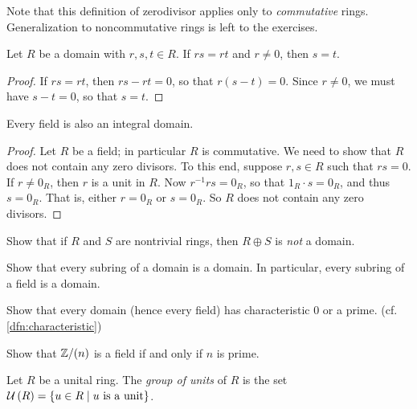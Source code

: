 Note that this definition of zerodivisor applies only to \emph{commutative} rings.
Generalization to noncommutative rings is left to the exercises.

\begin{prop}[Cancellation] \label{prop:cancellation}
Let \(R\) be a domain with \(r,s,t \in R\).
If \(rs = rt\) and \(r \neq 0\), then \(s = t\).
\end{prop}

\begin{proof}
If \(rs = rt\), then \(rs - rt = 0\), so that \(r(s-t) = 0\).
Since \(r \neq 0\), we must have \(s-t = 0\), so that \(s = t\).
\end{proof}


\begin{prop}
Every field is also an integral domain.
\end{prop}

\begin{proof}
Let \(R\) be a field; in particular \(R\) is commutative.
We need to show that \(R\) does not contain any zero divisors.
To this end, suppose \(r,s \in R\) such that \(rs = 0\).
If \(r \neq 0_R\), then \(r\) is a unit in \(R\).
Now \(r^{-1}rs = 0_R\), so that \(1_R \cdot s = 0_R\), and thus \(s = 0_R\).
That is, either \(r = 0_R\) or \(s = 0_R\).
So \(R\) does not contain any zero divisors.
\end{proof}



\Exercises%

\begin{exercise}
Show that if \(R\) and \(S\) are nontrivial rings, then \(R \oplus S\) is \emph{not} a domain.
\end{exercise}

\begin{exercise}
Show that every subring of a domain is a domain.
In particular, every subring of a field is a domain.
\end{exercise}

\begin{exercise}
Show that every domain (hence every field) has characteristic 0 or a prime.
(cf. \ref{dfn:characteristic})
\end{exercise}

\begin{exercise}
Show that \(\mathbb{Z}/(n)\) is a field if and only if \(n\) is prime.
\end{exercise}

\begin{dfn}
Let \(R\) be a unital ring.
The \emph{group of units} of \(R\) is the set \(\UNITS{R} = \{ u \in R \mid u\ \mathrm{is\ a\ unit} \}\).
\end{dfn}

